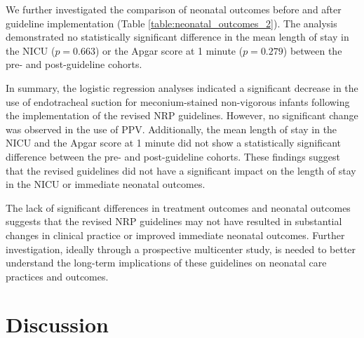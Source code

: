 \documentclass[11pt]{article}
\begin{document}
We further investigated the comparison of neonatal outcomes before and after guideline implementation (Table {}\ref{table:neonatal_outcomes_2}). The analysis demonstrated no statistically significant difference in the mean length of stay in the NICU ($p = 0.663$) or the Apgar score at 1 minute ($p = 0.279$) between the pre- and post-guideline cohorts.

\begin{table}[h]
\caption{Comparison of neonatal outcomes before and after guideline implementation}
\label{table:neonatal_outcomes_2}
\begin{threeparttable}
\renewcommand{\TPTminimum}{\linewidth}
\begin{tablenotes}
\footnotesize
\item 
\end{tablenotes}
\end{threeparttable}
\end{table}


In summary, the logistic regression analyses indicated a significant decrease in the use of endotracheal suction for meconium-stained non-vigorous infants following the implementation of the revised NRP guidelines. However, no significant change was observed in the use of PPV. Additionally, the mean length of stay in the NICU and the Apgar score at 1 minute did not show a statistically significant difference between the pre- and post-guideline cohorts. These findings suggest that the revised guidelines did not have a significant impact on the length of stay in the NICU or immediate neonatal outcomes.

The lack of significant differences in treatment outcomes and neonatal outcomes suggests that the revised NRP guidelines may not have resulted in substantial changes in clinical practice or improved immediate neonatal outcomes. Further investigation, ideally through a prospective multicenter study, is needed to better understand the long-term implications of these guidelines on neonatal care practices and outcomes.

\section*{Discussion}
\end{document}
